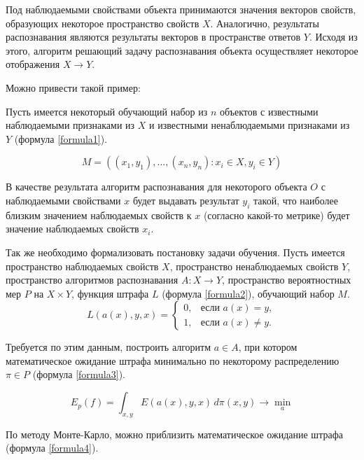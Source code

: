 
Под наблюдаемыми свойствами объекта принимаются значения векторов свойств, образующих некоторое пространство свойств $X$. Аналогично, результаты распознавания являются результаты векторов в пространстве ответов $Y$. Исходя из этого, алгоритм решающий задачу распознавания объекта осуществляет некоторое отображения $X \rightarrow Y$.

Можно привести такой пример:

Пусть имеется некоторый обучающий набор из $n$ объектов с известными наблюдаемыми признаками из $X$ и известными ненаблюдаемыми признаками из $Y$ (формула \ref{formula1}).

\begin{equation}
M = ((x_1, y_1), ... , (x_n, y_n) : x_i \in X, y_i \in Y)
\label{formula1}
\end{equation}

В качестве результата алгоритм распознавания для некоторого объекта $O$ с наблюдаемыми свойствами $x$ будет выдавать результат $y_i$ такой, что наиболее близким значением наблюдаемых свойств к $x$ (согласно какой-то метрике) будет значение наблюдаемых свойств $x_i$. 

Так же необходимо формализовать постановку задачи обучения. Пусть имеется пространство наблюдаемых свойств $X$, пространство ненаблюдаемых свойств $Y$, пространство алгоритмов распознавания $A: X \rightarrow Y$, пространство вероятностных мер $P$ на $X \times Y$, функция штрафа $L$ (формула \ref{formula2}), обучающий набор $M$. 
\begin{equation}
L(a(x), y, x) =
\begin{cases}
0, & \text{если } a(x) = y, \\
1, & \text{если } a(x) \neq y.
\end{cases}
\label{formula2}
\end{equation}

Требуется по этим данным, построить алгоритм $a \in A$, при котором математическое ожидание штрафа минимально по некоторому распределению $\pi \in P$ (формула \ref{formula3}).

\begin{equation}
E_p(f) = \int_{x, y} E(a(x), y, x) \, d \pi (x, y) \to \min_a
\label{formula3}
\end{equation}

По методу Монте-Карло, можно приблизить математическое ожидание штрафа (формула \ref{formula4}).

